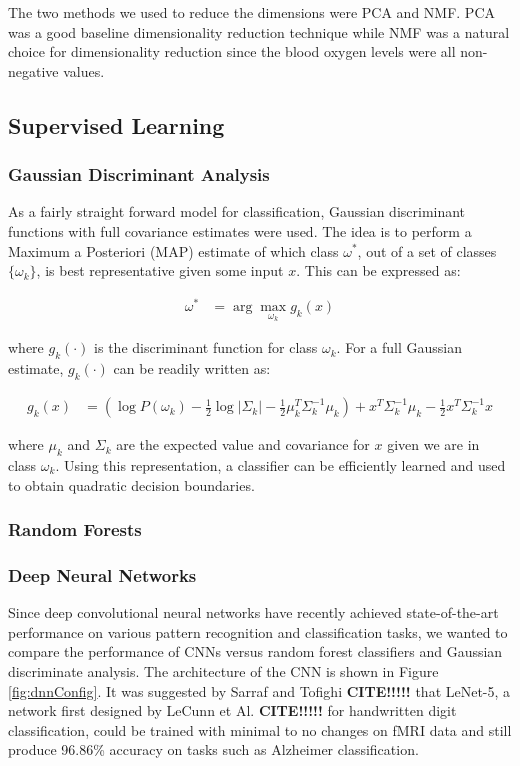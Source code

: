 \documentclass{article}[12pt]
\begin{document}
   The two methods we used to reduce the dimensions were PCA and NMF. PCA was a good baseline dimensionality reduction technique while NMF was a natural choice for dimensionality reduction since the blood oxygen levels were all non-negative values. 
   
   \subsection{Supervised Learning}
   \subsubsection{Gaussian Discriminant Analysis}
   As a fairly straight forward model for classification, Gaussian discriminant functions with full covariance estimates were used. The idea is to perform a Maximum a Posteriori (MAP) estimate of which class $\omega^*$, out of a set of classes $\lbrace \omega_k \rbrace$, is best representative given some input $x$. This can be expressed as:
   
   \begin{align*}
   \omega^* &= \arg \max_{\omega_k} g_k(x)
   \end{align*}
   
   where $g_k(\cdot)$ is the discriminant function for class $\omega_k$. For a full Gaussian estimate, $g_k(\cdot)$ can be readily written as:
   
   \begin{align*}
   g_k(x) &= \left( \log P(\omega_k) - \frac{1}{2} \log \left| \Sigma_k \right| - \frac{1}{2} \mu_k^T \Sigma_k^{-1} \mu_k \right) + x^T \Sigma_k^{-1} \mu_k - \frac{1}{2} x^T \Sigma_k^{-1} x 
   \end{align*}
   
   where $\mu_k$ and $\Sigma_k$ are the expected value and covariance for $x$ given we are in class $\omega_k$. Using this representation, a classifier can be efficiently learned and used to obtain quadratic decision boundaries.
   
   
   \subsubsection{Random Forests}
   \subsubsection{Deep Neural Networks}
   Since deep convolutional neural networks have recently achieved state-of-the-art performance on various pattern recognition and classification tasks, we wanted to compare the performance of CNNs versus random forest classifiers and Gaussian discriminate analysis. The architecture of the CNN is shown in Figure \ref{fig:dnnConfig}.  It was suggested by Sarraf and Tofighi \textbf{CITE!!!!!} that LeNet-5, a network first designed by LeCunn et Al. \textbf{CITE!!!!!} for handwritten digit classification, could be trained with minimal to no changes on fMRI data and still produce 96.86\% accuracy on tasks such as Alzheimer classification. 
   
\end{document}
